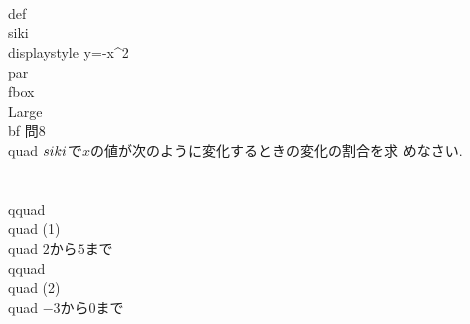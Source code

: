 \\\\
\\def\\siki{\\displaystyle y=-x^{2}}
\\par\\fbox{{\\Large\\bf 問8}}\\quad
 $\\siki$で$x$の値が次のように変化するときの変化の割合を求
 めなさい. 
 \\\\
 \\qquad\\quad (1)\\quad $2$から$5$まで
 \\qquad\\quad (2)\\quad $-3$から$0$まで
 \\\\
